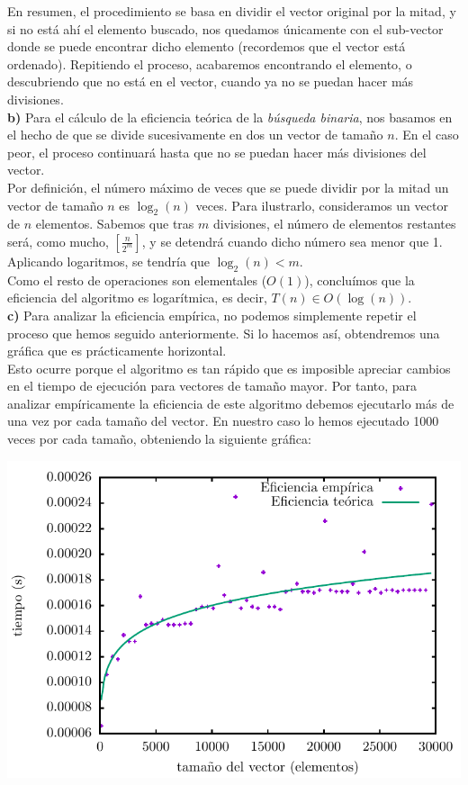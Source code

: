 \documentclass[11pt,a4paper]{article}
\begin{document}
En resumen, el procedimiento se basa en dividir el vector original por la mitad, y si no está ahí el elemento buscado, nos quedamos únicamente con el sub-vector donde se puede encontrar dicho elemento (recordemos que el vector está ordenado). Repitiendo el proceso, acabaremos encontrando el elemento, o descubriendo que no está en el vector, cuando ya no se puedan hacer más divisiones.\\

\textbf{b)} Para el cálculo de la eficiencia teórica de la \textit{búsqueda binaria}, nos basamos en el hecho de que se divide sucesivamente en dos un vector de tamaño $n$. En el caso peor, el proceso continuará hasta que no se puedan hacer más divisiones del vector.\\

Por definición, el número máximo de veces que se puede dividir por la mitad un vector de tamaño $n$ es $\log_2 (n)$ veces. Para ilustrarlo, consideramos un vector de $n$ elementos. Sabemos que tras $m$ divisiones, el número de elementos restantes será, como mucho, $\left[\frac{n}{2^m}\right]$, y se detendrá cuando dicho número sea menor que 1. Aplicando logaritmos, se tendría que $\log_2 (n) < m$.\\

Como el resto de operaciones son elementales ($O(1)$), concluímos que la eficiencia del algoritmo es logarítmica, es decir, $T(n) \in O(\log (n))$.\\

\textbf{c)} Para analizar la eficiencia empírica, no podemos simplemente repetir el proceso que hemos seguido anteriormente. Si lo hacemos así, obtendremos una gráfica que es prácticamente horizontal. \\

Esto ocurre porque el algoritmo es tan rápido que es imposible apreciar cambios en el tiempo de ejecución para vectores de tamaño mayor. Por tanto, para analizar empíricamente la eficiencia de este algoritmo debemos ejecutarlo más de una vez por cada tamaño del vector. En nuestro caso lo hemos ejecutado 1000 veces por cada tamaño, obteniendo la siguiente gráfica:

\begin{center}
	\includegraphics{img/tiempos_binaria.pdf}
\end{center}
\end{document}
